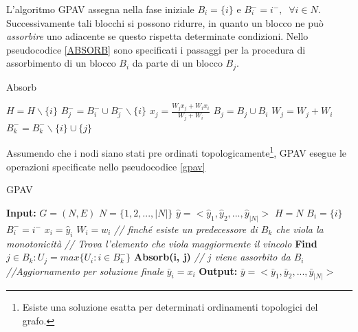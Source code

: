 \documentclass[12pt]{report}
\begin{document}
\newline
\newline
L'algoritmo GPAV assegna nella fase iniziale $B_i = \{i\}$ e $B_i^{-} = i^{-}, \;\; \forall i \in N$. Successivamente tali blocchi si possono ridurre, in quanto un blocco ne può \emph{assorbire} uno adiacente se questo rispetta determinate condizioni.  Nello pseudocodice \ref{ABSORB} sono specificati i passaggi per la procedura di assorbimento di un blocco $B_i$ da parte di un blocco $B_j$.
\begin{algorithm}[!htp]
\caption{Absorb}\label{ABSORB}
\begin{algorithmic}[1]
\State $ H = H \backslash \{i\} $
\State $ B_j^{-} = B_i^{-}\cup B_j^{-}\backslash \{i\} $
\State $x_j = \frac{W_j x_j + W_i x_i}{W_j + W_i}$
\State $B_j = B_j \cup B_i$
\State $W_j = W_j + W_i$
\State $B_k^{-} = B_k^{-}\backslash \{i\} \cup \{j\}$ 
\EndFor
\EndProcedure
\end{algorithmic}
\end{algorithm}
\newpage
Assumendo che i nodi siano stati pre ordinati topologicamente\footnote{\footnotesize{Esiste una soluzione esatta per determinati ordinamenti topologici del grafo\cite{optimGPAV}.}}, GPAV esegue le operazioni specificate nello pseudocodice \ref{gpav}

\begin{algorithm}[!htp]
\caption{GPAV}\label{gpav}
\begin{algorithmic}[1]
\State \textbf{Input: }
\State $G = (N, E)$
\State $N = \{1, 2, ..., |N|\} $ 
\State $\hat{y} = <\hat{y}_1, \hat{y}_2, ...,\hat{y}_{|N|}>$
\State $ H = N $
\State $B_i = \{i\}$ 
\State $B_i^{-} = i^{-}$
\State $x_i = \hat{y}_i$
\State $W_i = w_i$
\EndFor
{}
\State \emph{// finché esiste un predecessore di $B_{k}$ che viola la monotonicità}
\State \emph{// Trova l'elemento che viola maggiormente il vincolo}
\State \textbf{Find} $j \in B_k: U_j = max\{U_i : i \in B_k^{-}\}$ 
\State \textbf{Absorb(i, j)} \emph{// $j$ viene assorbito da $B_i$}
\EndWhile
\EndFor
\State \emph{//Aggiornamento per soluzione finale }  
\State $\bar{y}_i = x_i$  
\EndFor
\EndFor
\EndProcedure
\State \textbf{Output: }
\State $\bar{y} = <\bar{y}_1, \bar{y}_2, ...,\bar{y}_{|N|}>$
\end{algorithmic}
\end{algorithm}
\end{document}
